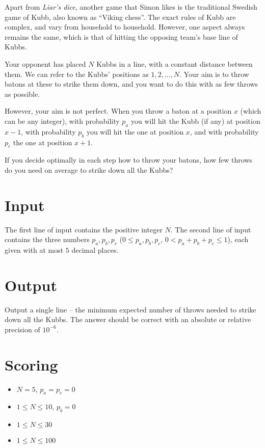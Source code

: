 Apart from \emph{Liar's dice}, another game that Simon likes is the traditional Swedish game of Kubb,
also known as ``Viking chess''.
The exact rules of Kubb are complex, and vary from household to household.
However, one aspect always remains the same, which is that of hitting the opposing team's base line of Kubbs.

Your opponent has placed $N$ Kubbs in a line, with a constant distance between them.
We can refer to the Kubbs' positions as $1, 2, \dots, N$.
Your aim is to throw batons at these to strike them down, and
you want to do this with as few throws as possible.

However, your aim is not perfect. When you throw a baton at a position $x$ (which can be any integer),
with probability $p_a$ you will hit the Kubb (if any) at position $x-1$,
with probability $p_b$ you will hit the one at position $x$, and
with probability $p_c$ the one at position $x+1$.

If you decide optimally in each step how to throw your batons,
how few throws do you need on average to strike down all the Kubbs?

\section*{Input}
The first line of input contains the positive integer $N$.
The second line of input contains the three numbers $p_a, p_b, p_c$ ($0 \le p_a, p_b, p_c$, $0 < p_a + p_b + p_c \le 1$),
each given with at most $5$ decimal places.

\section*{Output}
Output a single line -- the minimum expected number of throws needed to strike down all the Kubbs.
The answer should be correct with an absolute or relative precision of $10^{-6}$.

\section*{Scoring}
\begin{itemize}
  \item $N = 5$, $p_a = p_c = 0$
  \item $1 \le N \le 10$, $p_b = 0$
  \item $1 \le N \le 30$
  \item $1 \le N \le 100$
\end{itemize}

